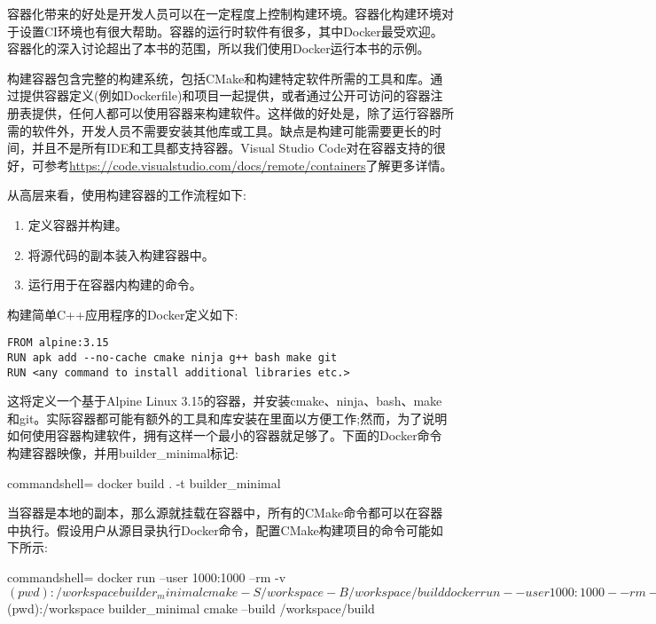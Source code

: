 容器化带来的好处是开发人员可以在一定程度上控制构建环境。容器化构建环境对于设置CI环境也有很大帮助。容器的运行时软件有很多，其中Docker最受欢迎。容器化的深入讨论超出了本书的范围，所以我们使用Docker运行本书的示例。

构建容器包含完整的构建系统，包括CMake和构建特定软件所需的工具和库。通过提供容器定义(例如Dockerfile)和项目一起提供，或者通过公开可访问的容器注册表提供，任何人都可以使用容器来构建软件。这样做的好处是，除了运行容器所需的软件外，开发人员不需要安装其他库或工具。缺点是构建可能需要更长的时间，并且不是所有IDE和工具都支持容器。Visual Studio Code对在容器支持的很好，可参考\url{https://code.visualstudio.com/docs/remote/containers}了解更多详情。

从高层来看，使用构建容器的工作流程如下:

\begin{enumerate}
\item 
定义容器并构建。

\item 
将源代码的副本装入构建容器中。

\item 
运行用于在容器内构建的命令。
\end{enumerate}

构建简单C++应用程序的Docker定义如下:

\begin{lstlisting}[style=styleCMake]
FROM alpine:3.15
RUN apk add --no-cache cmake ninja g++ bash make git
RUN <any command to install additional libraries etc.>
\end{lstlisting}

这将定义一个基于Alpine Linux 3.15的容器，并安装cmake、ninja、bash、make和git。实际容器都可能有额外的工具和库安装在里面以方便工作;然而，为了说明如何使用容器构建软件，拥有这样一个最小的容器就足够了。下面的Docker命令构建容器映像，并用builder\_minimal标记:

\begin{tcblisting}{commandshell={}}
docker build . -t builder_minimal
\end{tcblisting}

当容器是本地的副本，那么源就挂载在容器中，所有的CMake命令都可以在容器中执行。假设用户从源目录执行Docker命令，配置CMake构建项目的命令可能如下所示:

\begin{tcblisting}{commandshell={}}
docker run --user 1000:1000 --rm -v $(pwd):/workspace
  builder_minimal cmake -S /workspace -B /workspace/build
docker run --user 1000:1000 --rm -v $(pwd):/workspace
  builder_minimal cmake --build /workspace/build
\end{tcblisting}

